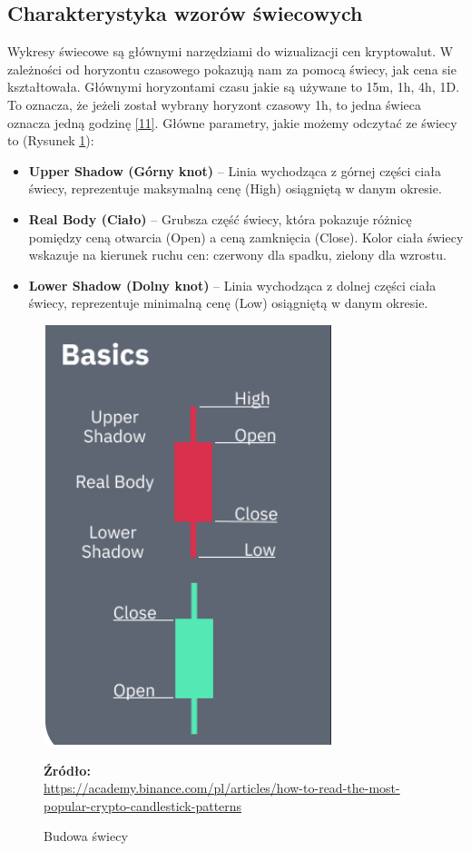 \documentclass[12pt,a4paper,twoside, inzynierska]{pwr_wmat_praca_dyplomowa}
\theoremstyle{plain}
\numberwithin{theorem}{chapter}
\theoremstyle{definition}
\numberwithin{theorem}{chapter}
\begin{document}
	\subsection{Charakterystyka wzorów świecowych}
	Wykresy świecowe są głównymi narzędziami do wizualizacji cen kryptowalut. W zależności od horyzontu czasowego pokazują nam za pomocą świecy, jak cena sie kształtowała. Głównymi horyzontami czasu jakie są używane to 15m, 1h, 4h, 1D. To oznacza, że jeżeli został wybrany horyzont czasowy 1h, to jedna świeca oznacza jedną godzinę \hyperref[info11]{[11]}. Główne parametry, jakie możemy odczytać ze świecy to (Rysunek \ref{fig:swieca}):
	\begin{itemize}
		\item \textbf{Upper Shadow (Górny knot)} -- Linia wychodząca z górnej części ciała świecy, reprezentuje maksymalną cenę (High) osiągniętą w danym okresie.
		\item \textbf{Real Body (Ciało)} -- Grubsza część świecy, która pokazuje różnicę pomiędzy ceną otwarcia (Open) a ceną zamknięcia (Close). Kolor ciała świecy wskazuje na kierunek ruchu cen: czerwony dla spadku, zielony dla wzrostu.
		\item \textbf{Lower Shadow (Dolny knot)} -- Linia wychodząca z dolnej części ciała świecy, reprezentuje minimalną cenę (Low) osiągniętą w danym okresie.
	\end{itemize}
	\vspace{12pt}
	\begin{figure}[H]
		\centering
		\includegraphics[width=0.5 \textwidth]{swieca.png}
		\caption{Budowa świecy}
		\label{fig:swieca}
		\textbf{Źródło:} \\
		\url{https://academy.binance.com/pl/articles/how-to-read-the-most-popular-crypto-candlestick-patterns}
	\end{figure}
	\vspace{12pt}
\end{document}
